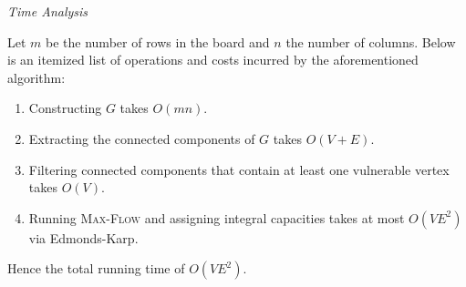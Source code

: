 \documentclass[10pt, letterpaper]{article}
\begin{document}
\begin{enumerate}[label={\bfseries Q\arabic*.}]
    \vspace*{\baselineskip}
    {\itshape Time Analysis} \par
    Let $m$ be the number of rows in the board and $n$ the number of columns. Below is an itemized list of
    operations and costs incurred by the aforementioned algorithm:
    \begin{enumerate}[label={\arabic*.},itemsep=0mm]
      \item Constructing $G$ takes $O(mn)$.
      \item Extracting the connected components of $G$ takes $O(V+E)$.
      \item Filtering connected components that contain at least one vulnerable vertex takes $O(V)$.
      \item Running \textsc{Max-Flow} and assigning integral capacities takes at most $O(VE^2)$ via Edmonds-Karp.
    \end{enumerate}
    Hence the total running time of $O(VE^2)$.
\end{enumerate}
\end{document}
